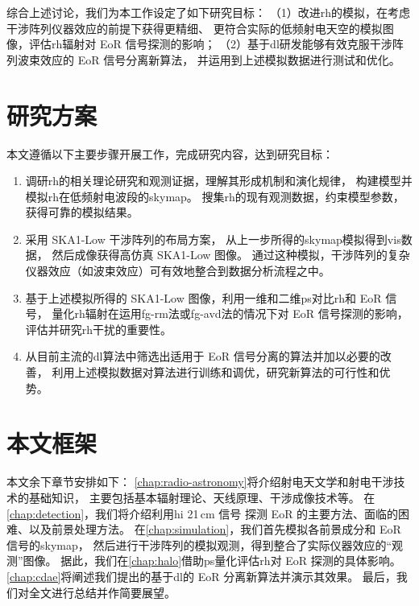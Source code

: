综合上述讨论，我们为本工作设定了如下研究目标：
（1）改进\ac{rh}的模拟，在考虑干涉阵列仪器效应的前提下获得更精细、
更符合实际的低频射电天空的模拟图像，评估\ac{rh}辐射对 EoR 信号探测的影响；
（2）基于\ac{dl}研发能够有效克服干涉阵列波束效应的 EoR 信号分离新算法，
并运用到上述模拟数据进行测试和优化。


\section{研究方案}

本文遵循以下主要步骤开展工作，完成研究内容，达到研究目标：
\begin{enumerate}
\item
调研\ac{rh}的相关理论研究和观测证据，理解其形成机制和演化规律，
构建模型并模拟\ac{rh}在低频射电波段的\ac{skymap}。
搜集\ac{rh}的现有观测数据，约束模型参数，获得可靠的模拟结果。

\item
采用 SKA1-Low 干涉阵列的布局方案，
从上一步所得的\ac{skymap}模拟得到\ac{vis}数据，
然后成像获得高仿真 SKA1-Low 图像。
通过这种模拟，干涉阵列的复杂仪器效应（如波束效应）可有效地整合到数据分析流程之中。

\item
基于上述模拟所得的 SKA1-Low 图像，利用一维和二维\ac{ps}对比\ac{rh}和 EoR 信号，
量化\ac{rh}辐射在运用\ac{fg-rm}法或\ac{fg-avd}法的情况下对 EoR 信号探测的影响，
评估并研究\ac{rh}干扰的重要性。

\item
从目前主流的\ac{dl}算法中筛选出适用于 EoR 信号分离的算法并加以必要的改善，
利用上述模拟数据对算法进行训练和调优，研究新算法的可行性和优势。

\end{enumerate}


\section{本文框架}

本文余下章节安排如下：
\autoref{chap:radio-astronomy}将介绍射电天文学和射电干涉技术的基础知识，
主要包括基本辐射理论、天线原理、干涉成像技术等。
在\autoref{chap:detection}，我们将介绍利用\ac{hi} 21\,cm 信号
探测 EoR 的主要方法、面临的困难、以及前景处理方法。
在\autoref{chap:simulation}，我们首先模拟各前景成分和 EoR 信号的\ac{skymap}，
然后进行干涉阵列的模拟观测，得到整合了实际仪器效应的\enquote{观测}图像。
据此，我们在\autoref{chap:halo}借助\ac{ps}量化评估\ac{rh}对
EoR 探测的具体影响。
\autoref{chap:cdae}将阐述我们提出的基于\ac{dl}的 EoR 分离新算法并演示其效果。
最后，我们对全文进行总结并作简要展望。

